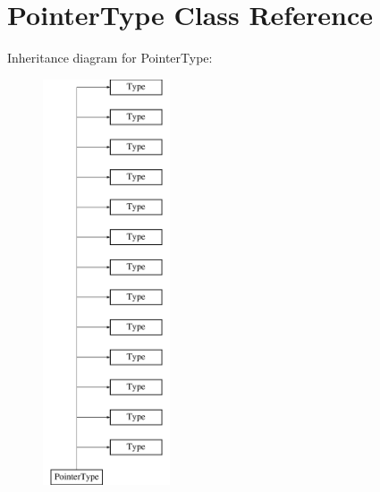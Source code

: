 \hypertarget{classPointerType}{\section{Pointer\-Type Class Reference}
\label{classPointerType}
}
Inheritance diagram for Pointer\-Type\-:\begin{figure}[H]
\begin{center}
\leavevmode
\includegraphics[height=12.000000cm]{classPointerType}
\end{center}
\end{figure}
